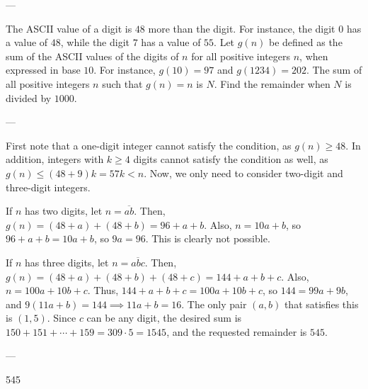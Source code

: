 
---

The ASCII value of a digit is $48$ more than the digit. For instance, the digit $0$ has a value of $48$, while the digit $7$ has a value of $55$. Let $g(n)$ be defined as the sum of the ASCII values of the digits of $n$ for all positive integers $n$, when expressed in base $10$. For instance, $g(10)=97$ and $g(1234)=202$. The sum of all positive integers $n$ such that $g(n)=n$ is $N$. Find the remainder when $N$ is divided by $1000$.

---

First note that a one-digit integer cannot satisfy the condition, as $g(n)\ge 48$. In addition, integers with $k\ge 4$ digits cannot satisfy the condition as well, as $g(n)\le (48+9)k=57k<n$. Now, we only need to consider two-digit and three-digit integers.

If $n$ has two digits, let $n=\overline{ab}$. Then, $g(n)=(48+a)+(48+b)=96+a+b$. Also, $n=10a+b$, so $96+a+b=10a+b$, so $9a=96$. This is clearly not possible.

If $n$ has three digits, let $n=\overline{abc}$. Then, $g(n)=(48+a)+(48+b)+(48+c)=144+a+b+c$. Also, $n=100a+10b+c$. Thus, $144+a+b+c=100a+10b+c$, so $144=99a+9b$, and $9(11a+b)=144\implies 11a+b=16$. The only pair $(a, b)$ that satisfies this is $(1, 5)$. Since $c$ can be any digit, the desired sum is $150+151+\cdots+159=309\cdot 5=1545$, and the requested remainder is $545$.

---

545
